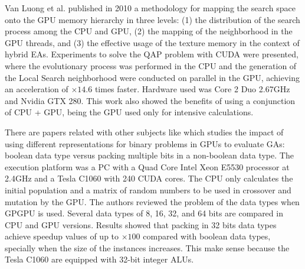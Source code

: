 \documentclass{article}
\begin{document}
Van Luong et al. \cite{5586403} published in 2010 a methodology for mapping the search space onto the GPU memory hierarchy in three levels: (1) the distribution of the search process among the CPU and GPU, (2) the mapping of the neighborhood in the GPU threads, and (3) the effective usage of the texture memory in the context of hybrid EAs. Experiments to solve the QAP problem with CUDA were presented, where the evolutionary process was performed in the CPU and the generation of the Local Search neighborhood were conducted on parallel in the GPU, achieving an acceleration of $\times14.6$ times faster. Hardware used was Core 2 Duo 2.67GHz and Nvidia GTX 280. This work also showed the benefits of using a conjunction of CPU + GPU, being the GPU used only for intensive calculations.


There are papers related with other subjects %
like \cite{Pedemonte:2011:BOG:2001858.2002031} which studies the impact of using different representations for binary problems in GPUs to evaluate GAs: boolean data type versus packing multiple bits in a non-boolean data type. The execution platform was a PC with a Quad Core Intel Xeon E5530 processor at 2.4GHz and a Tesla C1060 with 240 CUDA cores. The CPU only calculates the initial population and a matrix of random numbers to be used in crossover and mutation by the GPU. The authors reviewed the problem of the data types when GPGPU is used. Several data types of 8, 16, 32, and 64 bits are compared in CPU and GPU versions. Results showed that packing in 32 bits data types achieve speedup values of up to $\times100$ compared with boolean data types, specially when the size
of the instances increases. This make sense because the Tesla C1060
are equipped with 32-bit integer ALUs.  
\end{document}
